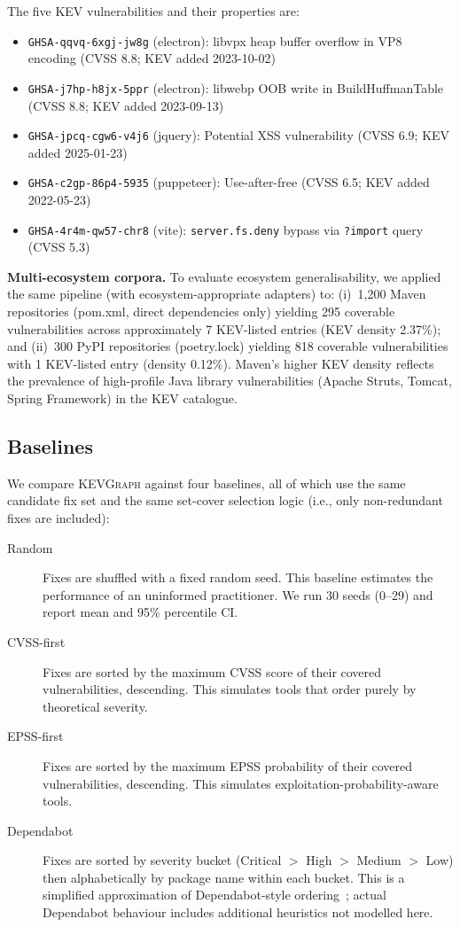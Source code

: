 \documentclass[conference]{IEEEtran}
\newcommand{\kevgraph}{\textsc{KEVGraph}\xspace}
\begin{document}
The five KEV vulnerabilities and their properties are:
\begin{itemize}
  \item \texttt{GHSA-qqvq-6xgj-jw8g} (electron): libvpx heap buffer
        overflow in VP8 encoding (CVSS 8.8; KEV added 2023-10-02)
  \item \texttt{GHSA-j7hp-h8jx-5ppr} (electron): libwebp OOB write in
        BuildHuffmanTable (CVSS 8.8; KEV added 2023-09-13)
  \item \texttt{GHSA-jpcq-cgw6-v4j6} (jquery): Potential XSS
        vulnerability (CVSS 6.9; KEV added 2025-01-23)
  \item \texttt{GHSA-c2gp-86p4-5935} (puppeteer): Use-after-free
        (CVSS 6.5; KEV added 2022-05-23)
  \item \texttt{GHSA-4r4m-qw57-chr8} (vite): \texttt{server.fs.deny}
        bypass via \texttt{?import} query (CVSS 5.3)
\end{itemize}

\textbf{Multi-ecosystem corpora.}
To evaluate ecosystem generalisability, we applied the same pipeline
(with ecosystem-appropriate adapters) to:
(i)~1,200 Maven repositories (pom.xml, direct dependencies only)
yielding 295 coverable vulnerabilities across approximately 7
KEV-listed entries (KEV density 2.37\%); and
(ii)~300 PyPI repositories (poetry.lock) yielding 818 coverable
vulnerabilities with 1 KEV-listed entry (density 0.12\%).
Maven's higher KEV density reflects the prevalence of high-profile
Java library vulnerabilities (Apache Struts, Tomcat, Spring
Framework) in the KEV catalogue.

\subsection{Baselines}

We compare \kevgraph against four baselines, all of which use the same
candidate fix set and the same set-cover selection logic (i.e., only
non-redundant fixes are included):

\begin{description}
  \item[Random] Fixes are shuffled with a fixed random seed.  This
        baseline estimates the performance of an uninformed practitioner.
        We run 30 seeds (0--29) and report mean and 95\% percentile CI.
  \item[CVSS-first] Fixes are sorted by the maximum CVSS score of their
        covered vulnerabilities, descending.  This simulates tools that
        order purely by theoretical severity.
  \item[EPSS-first] Fixes are sorted by the maximum EPSS probability of
        their covered vulnerabilities, descending.  This simulates
        exploitation-probability-aware tools.
  \item[Dependabot] Fixes are sorted by severity bucket
        (Critical $>$ High $>$ Medium $>$ Low) then alphabetically by
        package name within each bucket.  This is a simplified
        approximation of Dependabot-style ordering~\cite{dependabot};
        actual Dependabot behaviour includes additional heuristics
        not modelled here.
\end{description}
\end{document}
